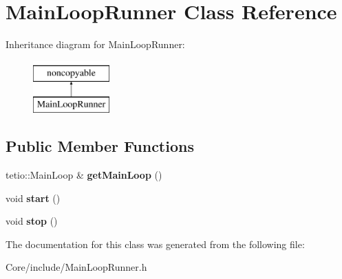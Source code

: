 \hypertarget{class_main_loop_runner}{}\section{Main\+Loop\+Runner Class Reference}
\label{class_main_loop_runner}
Inheritance diagram for Main\+Loop\+Runner\+:\begin{figure}[H]
\begin{center}
\leavevmode
\includegraphics[height=2.000000cm]{class_main_loop_runner}
\end{center}
\end{figure}
\subsection*{Public Member Functions}
\begin{DoxyCompactItemize}
\item 
\hypertarget{class_main_loop_runner_a90cb92e187a7e697bba8e6a7c0c0896e}{}\label{class_main_loop_runner_a90cb92e187a7e697bba8e6a7c0c0896e} 
tetio\+::\+Main\+Loop \& {\bfseries get\+Main\+Loop} ()
\item 
\hypertarget{class_main_loop_runner_a1c132147e055edb44a23f8d2bc384880}{}\label{class_main_loop_runner_a1c132147e055edb44a23f8d2bc384880} 
void {\bfseries start} ()
\item 
\hypertarget{class_main_loop_runner_ac566cf89b46777a383c89888167972bc}{}\label{class_main_loop_runner_ac566cf89b46777a383c89888167972bc} 
void {\bfseries stop} ()
\end{DoxyCompactItemize}


The documentation for this class was generated from the following file\+:\begin{DoxyCompactItemize}
\item 
Core/include/Main\+Loop\+Runner.\+h\end{DoxyCompactItemize}
